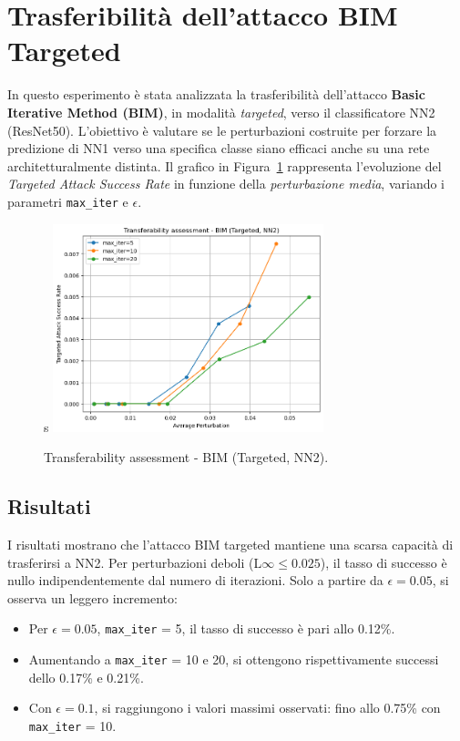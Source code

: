     \section{Trasferibilità dell'attacco BIM Targeted}
        In questo esperimento è stata analizzata la trasferibilità dell’attacco \textbf{Basic Iterative Method (BIM)}, in modalità \textit{targeted}, verso il classificatore NN2 (ResNet50). L’obiettivo è valutare se le perturbazioni costruite per forzare la predizione di NN1 verso una specifica classe siano efficaci anche su una rete architetturalmente distinta.
        Il grafico in Figura~\ref{fig:bim_targeted_transfer} rappresenta l’evoluzione del \textit{Targeted Attack Success Rate} in funzione della \textit{perturbazione media}, variando i parametri \texttt{max\_iter} e $\epsilon$.

        \begin{figure}[H]s
          \centering
          \includegraphics[width=0.7\textwidth]{images/bim_targeted_transferability.png}
          \caption{Transferability assessment - BIM (Targeted, NN2).}
          \label{fig:bim_targeted_transfer}
        \end{figure}

        \subsection{Risultati}
            I risultati mostrano che l'attacco BIM targeted mantiene una scarsa capacità di trasferirsi a NN2. Per perturbazioni deboli (L$\infty \leq 0.025$), il tasso di successo è nullo indipendentemente dal numero di iterazioni. Solo a partire da $\epsilon = 0.05$, si osserva un leggero incremento:
            
            \begin{itemize}
              \item Per $\epsilon = 0.05$, \texttt{max\_iter} = 5, il tasso di successo è pari allo 0.12\%.
              \item Aumentando a \texttt{max\_iter} = 10 e 20, si ottengono rispettivamente successi dello 0.17\% e 0.21\%.
              \item Con $\epsilon = 0.1$, si raggiungono i valori massimi osservati: fino allo 0.75\% con \texttt{max\_iter} = 10.
            \end{itemize}

